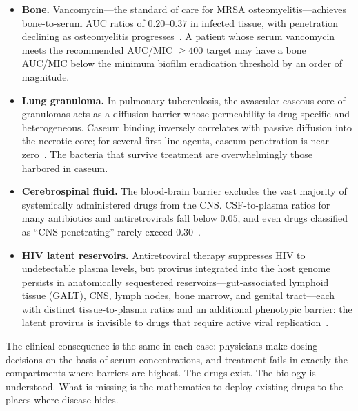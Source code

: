 \documentclass[11pt]{article}
\theoremstyle{plain}
\theoremstyle{definition}
\begin{document}
\begin{itemize}
  \item \textbf{Bone.} Vancomycin---the standard of care for MRSA
    osteomyelitis---achieves bone-to-serum AUC ratios of
    $0.20$--$0.37$ in infected tissue, with penetration declining as
    osteomyelitis progresses~\cite{Bue2018, Graziani1988,
    Landersdorfer2009}. A patient whose serum vancomycin meets the
    recommended AUC/MIC $\geq 400$ target may have a bone AUC/MIC
    below the minimum biofilm eradication threshold by an order of
    magnitude.

  \item \textbf{Lung granuloma.} In pulmonary tuberculosis, the
    avascular caseous core of granulomas acts as a diffusion barrier
    whose permeability is drug-specific and heterogeneous. Caseum
    binding inversely correlates with passive diffusion into the
    necrotic core; for several first-line agents, caseum penetration
    is near zero~\cite{Dartois2014, Prideaux2015, Sarathy2016}. The
    bacteria that survive treatment are overwhelmingly those
    harbored in caseum.

  \item \textbf{Cerebrospinal fluid.} The blood-brain barrier
    excludes the vast majority of systemically administered drugs
    from the CNS. CSF-to-plasma ratios for many antibiotics and
    antiretrovirals fall below $0.05$, and even drugs classified as
    ``CNS-penetrating'' rarely exceed $0.30$~\cite{Nau2010,
    Letendre2010}.

  \item \textbf{HIV latent reservoirs.} Antiretroviral therapy
    suppresses HIV to undetectable plasma levels, but provirus
    integrated into the host genome persists in anatomically
    sequestered reservoirs---gut-associated lymphoid tissue (GALT),
    CNS, lymph nodes, bone marrow, and genital tract---each with
    distinct tissue-to-plasma ratios and an additional phenotypic
    barrier: the latent provirus is invisible to drugs that require
    active viral replication~\cite{Finzi1999, Siliciano2003,
    Fletcher2014}.
\end{itemize}

The clinical consequence is the same in each case: physicians make
dosing decisions on the basis of serum concentrations, and treatment
fails in exactly the compartments where barriers are highest. The
drugs exist. The biology is understood. What is missing is the
mathematics to deploy existing drugs to the places where disease
hides.
\end{document}
